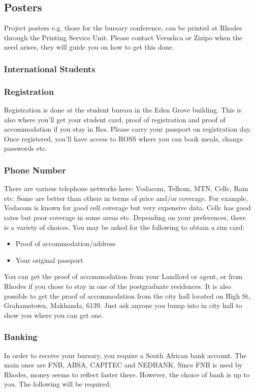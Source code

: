 \subsection{Posters}
Project posters e.g. those for the bursary conference, can be printed at Rhodes through the Printing Service Unit. Please contact Verushca or Zizipo when the need arises, they will guide you on how to get this done.

\subsubsection*{International Students}

\subsubsection*{Registration}
Registration is done at the student bureau in the Eden Grove building. This is also where you’ll get your student card, proof of registration and proof of accommodation if you stay in Res. Please carry your passport on registration day. Once registered, you’ll have access to ROSS where you can book meals, change passwords etc.

\subsubsection*{Phone Number}
There are various telephone networks here: Vodacom, Telkom, MTN, Cellc, Rain etc. Some are better than others in terms of price and/or coverage. For example, Vodacom is known for good cell coverage but very expensive data. Cellc has good rates but poor coverage in some areas etc. Depending on your preferences, there is a variety of choices. You may be asked for the following to obtain a sim card:
\begin{itemize}
    \item Proof of accommodation/address
    \item Your original passport
\end{itemize}
You can get the proof of accommodation from your Landlord or agent, or from Rhodes if you chose to stay in one of the postgraduate residences. It is also possible to get the proof of accommodation from the city hall located on High St, Grahamstown, Makhanda, 6139. Just ask anyone you bump into in city hall to show you where you can get one. 

\subsubsection*{Banking}
In order to receive your bursary, you require a South African bank account. The main ones are FNB, ABSA, CAPITEC and NEDBANK. Since FNB is used by Rhodes, money seems to reflect faster there. However, the choice of bank is up to you. The following will be required:


